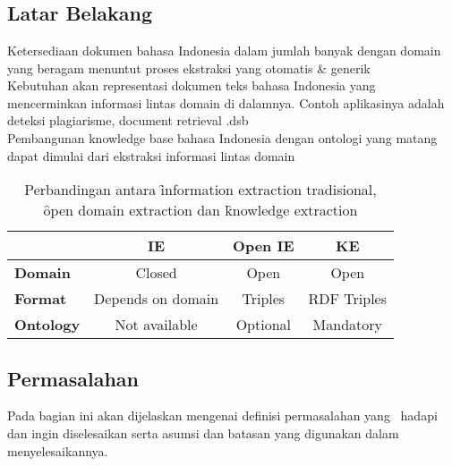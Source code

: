 \chapter{\babSatu}


\section{Latar Belakang}
Ketersediaan dokumen bahasa Indonesia dalam jumlah banyak dengan domain yang beragam menuntut proses ekstraksi yang otomatis \& generik \\

Kebutuhan akan representasi dokumen teks bahasa Indonesia yang mencerminkan informasi lintas domain di dalamnya. Contoh aplikasinya adalah deteksi plagiarisme, document retrieval .dsb \\

Pembangunan knowledge base bahasa Indonesia dengan ontologi yang matang dapat dimulai dari ekstraksi informasi lintas domain \\

\begin{table}
	\centering
	\caption{Perbandingan antara \f{information extraction} tradisional, \f{open domain extraction} dan \f{knowledge extraction}}
	\label{table_paradigm_comparison}
	\begin{tabular}{|l|c|c|c|}
		\hline 
		 & \textbf{IE} & \textbf{Open IE} & \textbf{KE} \\ 
		\hline 
		\textbf{Domain} & Closed & Open & Open \\ 
		\textbf{Format} & Depends on domain & Triples & RDF Triples \\ 
		\textbf{Ontology} & Not available & Optional & Mandatory \\ 
		\hline 
	\end{tabular} 
\end{table}

\section{Permasalahan}
Pada bagian ini akan dijelaskan mengenai definisi permasalahan 
yang \saya~hadapi dan ingin diselesaikan serta asumsi dan batasan 
yang digunakan dalam menyelesaikannya.


